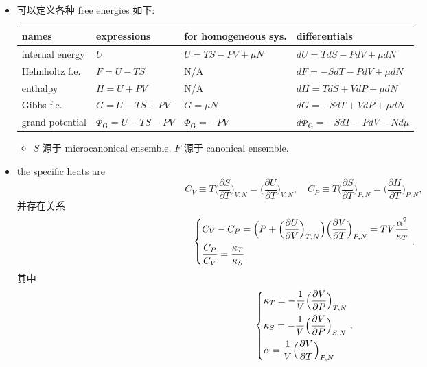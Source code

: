 \begin{itemize}
	\item 可以定义各种 free energies 如下:
	
	\begin{center}
		\begin{tabularx}{\linewidth}{XXXl}
			\toprule 
			names & expressions & for homogeneous sys. & differentials \\
			\midrule 
			internal energy & $U$ & $U = T S - P V + \mu N$ & $dU = T dS - P dV + \mu dN$ \\
			Helmholtz f.e. & $F = U - T S$ & N/A & $dF = - S dT - P dV + \mu dN$ \\
			enthalpy & $H = U + P V$ & N/A & $dH = T dS + V dP + \mu dN$ \\
			Gibbs f.e. & $G = U - T S + P V$ & $G = \mu N$ & $dG = - S dT + V dP + \mu dN$ \\
			grand potential & $\Phi_\text{G} = U - T S - P V$ & $\Phi_\text{G} = - P V$ & $d\Phi_\text{G} = - S dT - P dV - N d\mu$ \\
			\bottomrule
		\end{tabularx}
	\end{center}
	
	\begin{itemize}
		\item $S$ 源于 microcanonical ensemble, $F$ 源于 canonical ensemble.
	\end{itemize}
	
	\item the specific heats are
	\begin{equation}
		C_V \equiv T \Big( \frac{\partial S}{\partial T} \Big)_{V, N} = \Big( \frac{\partial U}{\partial T} \Big)_{V, N}, \quad C_P \equiv T \Big( \frac{\partial S}{\partial T} \Big)_{P, N} = \Big( \frac{\partial H}{\partial T} \Big)_{P, N},
	\end{equation}
	并存在关系
	\begin{equation}
		\begin{dcases}
			C_V - C_P = \Big( P + \Big( \frac{\partial U}{\partial V} \Big)_{T, N} \Big) \Big( \frac{\partial V}{\partial T} \Big)_{P, N}  = T V \frac{\alpha^2}{\kappa_T} \\
			\frac{C_P}{C_V} = \frac{\kappa_T}{\kappa_S}
		\end{dcases},
	\end{equation}
	其中
	\begin{equation}
		\begin{dcases}
			\kappa_T = - \frac{1}{V} \Big( \frac{\partial V}{\partial P} \Big)_{T, N} \\
			\kappa_S = - \frac{1}{V} \Big( \frac{\partial V}{\partial P} \Big)_{S, N} \\
			\alpha = \frac{1}{V} \Big( \frac{\partial V}{\partial T} \Big)_{P, N}
		\end{dcases}.
	\end{equation}
\end{itemize}

